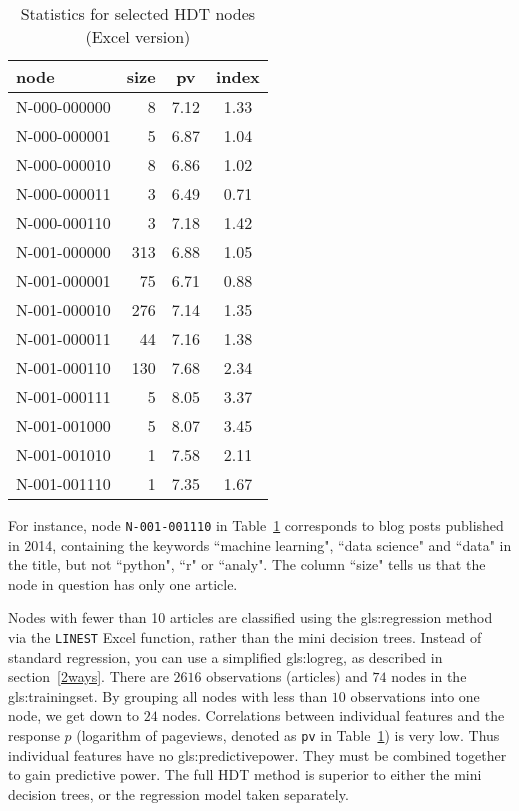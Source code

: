 \documentclass[oneside,10pt]{book}
\renewcommand{\arraystretch}{1.4} %
\begin{document}
\renewcommand{\arraystretch}{1.2} %
\begin{table}%
\begin{center}
\begin{tabular}{lrcc}
\hline
node & size & pv & index \\
\hline
N-000-000000 & 8 & 7.12 & 1.33 \\
N-000-000001 & 5 & 6.87 & 1.04 \\
N-000-000010 & 8 & 6.86 & 1.02 \\
N-000-000011 & 3 & 6.49 & 0.71 \\
N-000-000110 & 3 & 7.18 & 1.42 \\
N-001-000000 & 313 & 6.88 & 1.05 \\
N-001-000001 & 75 & 6.71 & 0.88 \\
N-001-000010 & 276 & 7.14 & 1.35 \\
N-001-000011 & 44 & 7.16 & 1.38 \\
N-001-000110 & 130 & 7.68 & 2.34 \\
N-001-000111 & 5 & 8.05 & 3.37 \\
N-001-001000 & 5 & 8.07 & 3.45 \\
N-001-001010 & 1 & 7.58 & 2.11 \\
N-001-001110 & 1 & 7.35 & 1.67 \\
\hline
\end{tabular}
\caption{\label{fffnode}Statistics for selected HDT nodes (Excel version)}
\end{center}
\end{table}
\renewcommand{\arraystretch}{1.0} %

For instance, node \texttt{N-001-001110} in Table~\ref{fffnode} corresponds to blog posts published in 2014, containing the keywords ``machine learning", ``data science" and ``data" in the title, but not ``python", ``r" or ``analy". The column ``size" tells us that the node in question has only one article.


Nodes with fewer than 10 articles are classified using the \gls{gls:regression} method via the \texttt{LINEST} Excel function, rather than the mini decision trees. Instead of standard regression, you can use a simplified \gls{gls:logreg}, 
 as described in section~\ref{2ways}. There are $\num{2616}$ observations (articles) and $74$ nodes in the \gls{gls:trainingset}. By grouping all nodes with less than $10$ observations into one node, we get down to $24$ nodes. Correlations between individual features and the response $p$ (logarithm of pageviews, denoted as
 \texttt{pv} in Table~\ref{fffnode}) is very low. Thus individual features have no \gls{gls:predictivepower}. They must be combined together
 to gain predictive power. The full HDT method is superior to either the mini decision trees, or the regression model taken separately.
\end{document}
